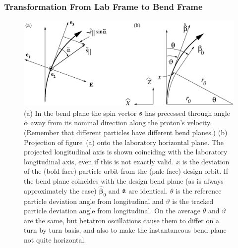 \documentclass[]{article}
\begin{document}
\subsubsection{Transformation From Lab Frame to Bend Frame}
%
\begin{figure}[h]
\centering
\includegraphics[scale=0.5]{xfig/Precess-reflected.eps}
\caption{\label{fig:Precess}
(a) In the bend plane the
spin vector ${\bf s}$ has precessed through angle
$\tilde \alpha$ away from its nominal direction along the
proton's velocity. (Remember that different particles
have different bend planes.)
(b) Projection of figure~(a) onto the laboratory horizontal
plane. The projected longitudinal axis is shown
coinciding with the laboratory longitudinal axis, even
if this is not exactly valid. $x$ is the deviation of 
the (bold face) particle orbit from the (pale face) design orbit. 
If the bend plane coincides with the design bend plane (as is 
always approximately the case) $\hat{\pmb \beta}_0$ and 
${\bf\hat z}$ are identical. $\theta$ is the reference
particle deviation angle from longitudinal and $\vartheta$
is the tracked particle deviation angle from longitudinal. 
On the average $\theta$ and $\vartheta$ are the same, but
betatron oscillations cause them to differ on a turn by turn
basis, and also to make the instantaneous bend plane not
quite horizontal.}
\end{figure}
%
\end{document}
